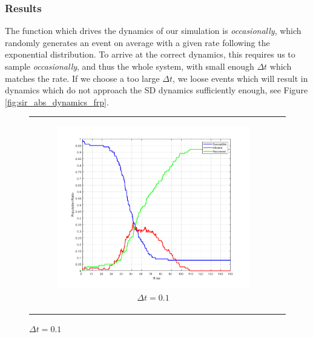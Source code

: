 \subsubsection{Results}
The function which drives the dynamics of our simulation is \textit{occasionally}, which randomly generates an event on average with a given rate following the exponential distribution. To arrive at the correct dynamics, this requires us to sample \textit{occasionally}, and thus the whole system, with small enough $\Delta t$ which matches the rate. If we choose a too large $\Delta t$, we loose events which will result in dynamics which do not approach the SD dynamics sufficiently enough, see Figure \ref{fig:sir_abs_dynamics_frp}.

\begin{figure}
\begin{center}
	\begin{tabular}{c c}
		\begin{subfigure}[b]{0.22\textwidth}
			\centering
			\includegraphics[width=1\textwidth, angle=0]{./fig/step2_yampa/SIR_100agents_150t_01dt.png}
			\caption{$\Delta t = 0.1$}
			\label{fig:sir_abs_approximating_01dt_100agents}
		\end{subfigure}
		
		&
    	

\end{tabular}
\end{center}
\end{figure}
